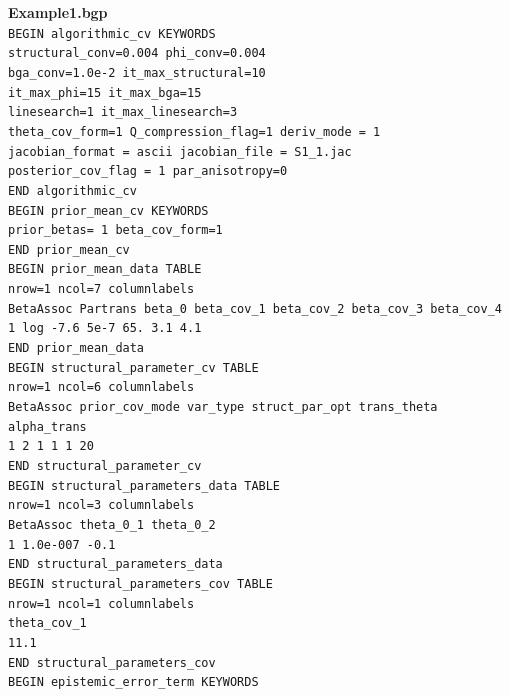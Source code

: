 \documentclass[11pt,oneside,onecolumn]{usgsreport}
\begin{document}
\begin{appendix}
\textbf{Example1.bgp} \\
\texttt{BEGIN algorithmic\_cv KEYWORDS \\
structural\_conv=0.004 phi\_conv=0.004 \\
bga\_conv=1.0e-2 it\_max\_structural=10 \\
it\_max\_phi=15 it\_max\_bga=15 \\
linesearch=1 it\_max\_linesearch=3 \\
theta\_cov\_form=1 Q\_compression\_flag=1 deriv\_mode = 1 \\
jacobian\_format = ascii jacobian\_file = S1\_1.jac \\
posterior\_cov\_flag = 1 par\_anisotropy=0 \\
END algorithmic\_cv \\
BEGIN prior\_mean\_cv KEYWORDS \\
prior\_betas= 1 beta\_cov\_form=1 \\
END prior\_mean\_cv \\
BEGIN prior\_mean\_data TABLE \\
nrow=1 ncol=7 columnlabels \\
BetaAssoc Partrans beta\_0 beta\_cov\_1 beta\_cov\_2 beta\_cov\_3 beta\_cov\_4 \\
1 log -7.6 5e-7 65. 3.1 4.1 \\
END prior\_mean\_data \\
BEGIN structural\_parameter\_cv TABLE \\
nrow=1 ncol=6 columnlabels \\
BetaAssoc prior\_cov\_mode var\_type struct\_par\_opt trans\_theta alpha\_trans \\
1 2 1 1 1 20 \\
END structural\_parameter\_cv \\
BEGIN structural\_parameters\_data TABLE\\
nrow=1 ncol=3 columnlabels \\
BetaAssoc theta\_0\_1 theta\_0\_2 \\
1 1.0e-007 -0.1 \\
END structural\_parameters\_data\\
BEGIN structural\_parameters\_cov TABLE \\
nrow=1 ncol=1 columnlabels \\
theta\_cov\_1 \\
11.1 \\
END structural\_parameters\_cov\\
BEGIN epistemic\_error\_term KEYWORDS \\
}
\end{appendix}
\end{document}
